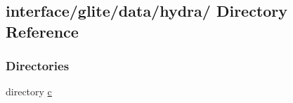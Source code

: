 \hypertarget{dir_000003}{
\subsection{interface/glite/data/hydra/ Directory Reference}
\label{dir_000003}
}
\subsubsection*{Directories}
\begin{CompactItemize}
\item 
directory \hyperlink{dir_000004}{c}
\end{CompactItemize}
